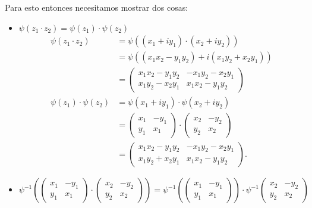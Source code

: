 \documentclass{report}
\begin{document}
\begin{enumerate}
\begin{itemize}
	Para esto entonces necesitamos mostrar dos cosas:
	\begin{itemize}
	  \item $\psi\left( z_1\cdot z_2 \right) = \psi\left( z_1 \right) \cdot \psi\left( z_2 \right) $
	    \begin{align*}
	      \psi\left( z_1\cdot z_2 \right) &= \psi\left( \left( x_1+iy_1 \right) \cdot \left( x_2+iy_2 \right)  \right)  \\
	      &= \psi\left( \left( x_1x_2-y_1y_2 \right) + i\left( x_1y_2 + x_2y_1 \right)  \right)  \\
	      &= \begin{pmatrix} x_1x_2-y_1y_2 & -x_1y_2-x_2y_1 \\ x_1y_2-x_2y_1 & x_1x_2 - y_1y_2 \end{pmatrix}  \\
	      \psi\left( z_1 \right) \cdot \psi\left( z_2 \right) &= \psi\left( x_1+iy_1 \right) \cdot \psi\left( x_2+iy_2 \right) \\
	      &= \begin{pmatrix} x_1 & -y_1 \\ y_1 & x_1 \end{pmatrix} \cdot \begin{pmatrix} x_2 & -y_2 \\ y_2 & x_2 \end{pmatrix}  \\
	      &= \begin{pmatrix} x_1x_2 -y_1y_2 & -x_1y_2 -x_2y_1 \\ x_1y_2 + x_2y_1 & x_1x_2 - y_1y_2 \end{pmatrix}
	    .\end{align*}
	  \item $\psi^{-1}\left( \begin{pmatrix} x_1 & -y_1 \\ y_1 & x_1 \end{pmatrix} \cdot \begin{pmatrix} x_2 & -y_2 \\ y_2 & x_2 \end{pmatrix}  \right) = \psi^{-1}\left( \begin{pmatrix} x_1&-y_1\\y_1&x_1 \end{pmatrix}  \right) \cdot \psi^{-1}\begin{pmatrix} x_2&-y_2\\y_2&x_2 \end{pmatrix} $
	    \begin{align*}

\end{align*}
\end{itemize}
\end{itemize}
\end{enumerate}
\end{document}
